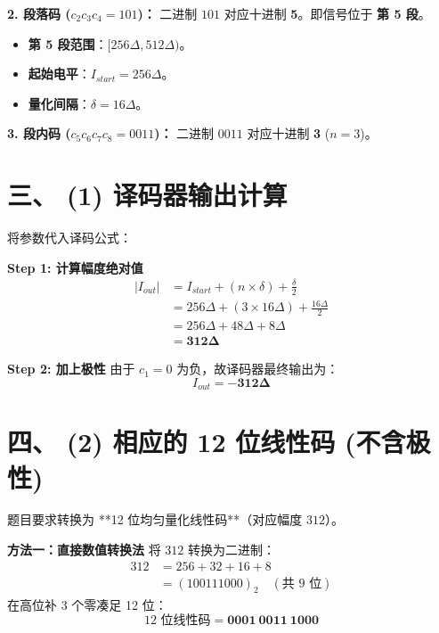 \documentclass[a4paper,11pt]{ctexart}
\begin{document}
    \textbf{2. 段落码 ($c_2 c_3 c_4 = 101$)：}
    二进制 $101$ 对应十进制 \textbf{5}。即信号位于 \textbf{第 5 段}。
    \begin{itemize}
        \item \textbf{第 5 段范围}：$[256\Delta, 512\Delta)$。
        \item \textbf{起始电平}：$I_{start} = 256\Delta$。
        \item \textbf{量化间隔}：$\delta = 16\Delta$。
    \end{itemize}
    
    \textbf{3. 段内码 ($c_5 c_6 c_7 c_8 = 0011$)：}
    二进制 $0011$ 对应十进制 \textbf{3} ($n=3$)。

    \hrulefill

    \section*{三、 (1) 译码器输出计算}
    
    将参数代入译码公式：
    
    \textbf{Step 1: 计算幅度绝对值}
    \begin{align*}
        |I_{out}| &= I_{start} + (n \times \delta) + \frac{\delta}{2} \\
                  &= 256\Delta + (3 \times 16\Delta) + \frac{16\Delta}{2} \\
                  &= 256\Delta + 48\Delta + 8\Delta \\
                  &= \mathbf{312\Delta}
    \end{align*}
    
    \textbf{Step 2: 加上极性}
    由于 $c_1=0$ 为负，故译码器最终输出为：
    $$ I_{out} = \mathbf{-312\Delta} $$

    \hrulefill

    \section*{四、 (2) 相应的 12 位线性码 (不含极性)}
    
    题目要求转换为 **12 位均匀量化线性码**（对应幅度 $312$）。
    
    \textbf{方法一：直接数值转换法}
    将 $312$ 转换为二进制：
    \begin{align*}
        312 &= 256 + 32 + 16 + 8 \\
            &= (100111000)_2 \quad (\text{共 9 位})
    \end{align*}
    在高位补 3 个零凑足 12 位：
    $$ \text{12 位线性码} = \mathbf{0001 \ 0011 \ 1000} $$
    
\end{document}
